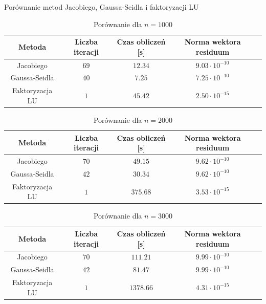 \documentclass{article}
\begin{document}
\begin{section}{Porównanie metod Jacobiego, Gaussa-Seidla i faktoryzacji LU}
    \begin{table}
        \centering
        \begin{tabular}{|c|c|c|c|c|}
            \hline
            Metoda & Liczba iteracji & Czas obliczeń [s] & Norma wektora residuum \\
            \hline
            Jacobiego & $69$ & $12.34$ & $9.03\cdot10^{-10}$ \\
            Gaussa-Seidla & $40$ & $7.25$ & $7.25\cdot10^{-10}$ \\
            Faktoryzacja LU & $1$ & $45.42$ & $2.50\cdot10^{-15}$ \\
            \hline
        \end{tabular}
        \caption{Porównanie dla $n = 1000$}
    \end{table}

    \begin{table}
        \centering
        \begin{tabular}{|c|c|c|c|c|}
            \hline
            Metoda & Liczba iteracji & Czas obliczeń [s] & Norma wektora residuum \\
            \hline
            Jacobiego & $70$ & $49.15$ & $9.62\cdot10^{-10}$ \\
            Gaussa-Seidla & $42$ & $30.34$ & $9.62\cdot10^{-10}$ \\
            Faktoryzacja LU & $1$ & $375.68$ & $3.53\cdot10^{-15}$ \\
            \hline
        \end{tabular}
        \caption{Porównanie dla $n = 2000$}
    \end{table}

    \begin{table}
        \centering
        \begin{tabular}{|c|c|c|c|c|}
            \hline
            Metoda & Liczba iteracji & Czas obliczeń [s] & Norma wektora residuum \\
            \hline
            Jacobiego & $70$ & $111.21$ & $9.99\cdot10^{-10}$ \\
            Gaussa-Seidla & $42$ & $81.47$ & $9.99\cdot10^{-10}$ \\
            Faktoryzacja LU & $1$ & $1378.66$ & $4.31\cdot10^{-15}$ \\
            \hline
        \end{tabular}
        \caption{Porównanie dla $n = 3000$}
    \end{table}


\end{section}
\end{document}
